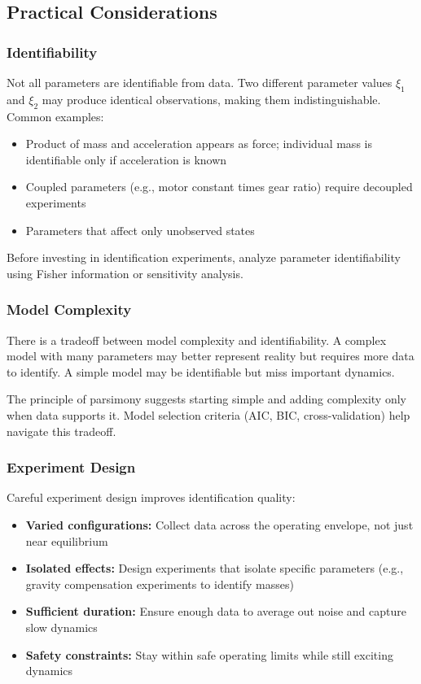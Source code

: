 \subsection{Practical Considerations}

\subsubsection{Identifiability}

Not all parameters are identifiable from data. Two different parameter values $\xi_1$ and $\xi_2$ may produce identical observations, making them indistinguishable. Common examples:
\begin{itemize}
    \item Product of mass and acceleration appears as force; individual mass is identifiable only if acceleration is known
    \item Coupled parameters (e.g., motor constant times gear ratio) require decoupled experiments
    \item Parameters that affect only unobserved states
\end{itemize}

Before investing in identification experiments, analyze parameter identifiability using Fisher information or sensitivity analysis.

\subsubsection{Model Complexity}

There is a tradeoff between model complexity and identifiability. A complex model with many parameters may better represent reality but requires more data to identify. A simple model may be identifiable but miss important dynamics.

The principle of parsimony suggests starting simple and adding complexity only when data supports it. Model selection criteria (AIC, BIC, cross-validation) help navigate this tradeoff.

\subsubsection{Experiment Design}

Careful experiment design improves identification quality:
\begin{itemize}
    \item \textbf{Varied configurations:} Collect data across the operating envelope, not just near equilibrium
    \item \textbf{Isolated effects:} Design experiments that isolate specific parameters (e.g., gravity compensation experiments to identify masses)
    \item \textbf{Sufficient duration:} Ensure enough data to average out noise and capture slow dynamics
    \item \textbf{Safety constraints:} Stay within safe operating limits while still exciting dynamics
\end{itemize}

